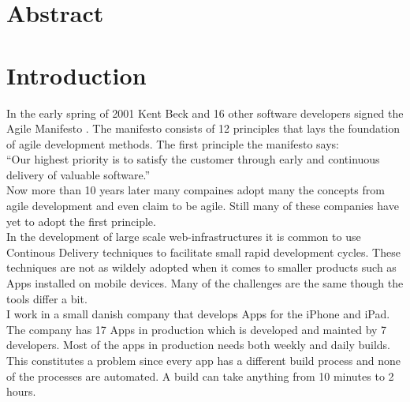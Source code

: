 \documentclass{ituthesis}
\begin{document}

\frontmatter

\thetitlepage

\chapter*{Abstract}



\clearpage
\setcounter{tocdepth}{1}

\mainmatter

\midsloppy
\sloppybottom

\chapter{Introduction}

In the early spring of 2001 Kent Beck and 16 other software developers signed the Agile Manifesto \cite{beck2001agile}. The manifesto consists of 12 principles that lays the foundation of agile development methods. The first principle the manifesto says:\\

``Our highest priority is to satisfy the customer through early and continuous delivery
of valuable software.'' \cite{beck2001agile}\\

Now more than 10 years later many compaines adopt many the concepts from agile development and even claim to be agile. Still many of these companies have yet to adopt the first principle.\\

In the development of large scale web-infrastructures it is common to use Continous Delivery techniques to facilitate small rapid development cycles. These techniques are not as wildely adopted when it comes to smaller products such as Apps installed on mobile devices. Many of the challenges are the same though the tools differ a bit.\\

I work in a small danish company that develops Apps for the iPhone and iPad. The company has 17 Apps in production which is developed and mainted by 7 developers. Most of the apps in production needs both weekly and daily builds. This constitutes a problem since every app has a different build process and none of the processes are automated. A build can take anything from 10 minutes to 2 hours. \cite{Humble2006}

\end{document}
